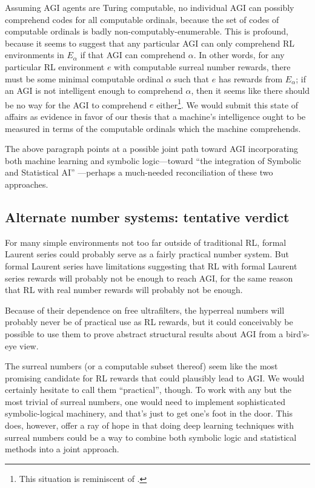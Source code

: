 \documentclass[twoside,11pt]{article}
\begin{document}
Assuming AGI agents are Turing computable,
no individual AGI can possibly comprehend codes for all computable ordinals, because
the set of codes of computable ordinals is badly non-computably-enumerable.
This is profound, because it seems to suggest that any particular AGI can
only comprehend RL environments in $E_\alpha$ if that AGI can comprehend $\alpha$.
In other words, for any particular RL environment $e$ with computable surreal number
rewards, there must be some minimal computable ordinal $\alpha$ such that $e$ has
rewards from $E_\alpha$; if an AGI is not intelligent enough to comprehend $\alpha$,
then it seems like there should be no way for the AGI to comprehend $e$
either\footnote{This situation is reminiscent of \citep{hibbard2011measuring}.}.
We would submit
this state of affairs as evidence in favor of our thesis
\citep{alexander2019measuring} that a machine's intelligence ought to be measured
in terms of the computable ordinals which the machine comprehends.

The above paragraph points at a possible joint path
toward AGI incorporating both machine learning and symbolic logic---toward
``the integration of Symbolic and Statistical AI'' \citep{maruyama}---perhaps
a much-needed reconciliation of these two approaches.

\subsection{Alternate number systems: tentative verdict}

For many simple environments not too far outside of traditional RL,
formal Laurent series could probably serve as a fairly practical number system.
But formal Laurent series have limitations suggesting that RL
with formal Laurent series rewards will probably not be enough to reach AGI, for the
same reason that RL with real number rewards will probably not be enough.

Because of their dependence on free ultrafilters, the hyperreal numbers will
probably never be of practical use as RL rewards, but it could conceivably be
possible to use them to prove abstract structural results about AGI from a
bird's-eye view.

The surreal numbers (or a computable subset thereof) seem like the most promising
candidate for RL rewards that could plausibly lead to AGI. We would certainly
hesitate to call them ``practical'', though. To work with any but the most trivial
of surreal numbers, one would need to implement sophisticated symbolic-logical
machinery, and that's just to get one's foot in the door. This does, however, offer
a ray of hope in that doing deep learning techniques with surreal numbers
could be a way to combine both symbolic logic and statistical methods into a joint
approach.
\end{document}
